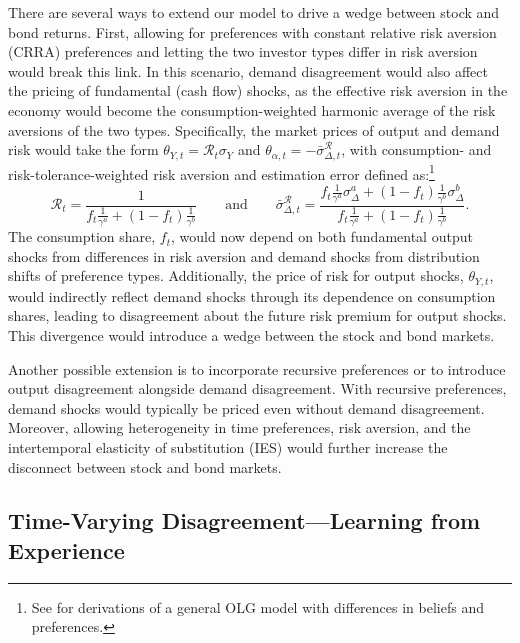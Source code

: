 \documentclass[preprint,11pt,authoryear]{elsarticle}
\theoremstyle{plain}
\begin{document}
There are several ways to extend our model to drive a wedge between stock and bond returns. First, allowing for preferences with constant relative risk aversion (CRRA) preferences and letting the two investor types differ in risk aversion would break this link. In this scenario, demand disagreement would also affect the pricing of fundamental (cash flow) shocks, as the effective risk aversion in the economy would become the consumption-weighted harmonic average of the risk aversions of the two types. Specifically, the market prices of output and demand risk would take the form \(\theta_{Y,t} = \mathcal{R}_t \sigma_Y\) and \(\theta_{\alpha,t} = -\bar{\sigma}^{\mathcal{R}}_{\Delta,t}\), with consumption- and risk-tolerance-weighted risk aversion and estimation error defined as:\footnote{See \cite{HeyerdahlLarsenIlledistch23} for derivations of a general OLG model with differences in beliefs and preferences.}
\begin{equation}
\mathcal{R}_t = \frac{1}{f_t \frac{1}{\gamma^a} + \left(1 - f_t\right) \frac{1}{\gamma^b}} \qquad \text{and} \qquad \bar{\sigma}^{\mathcal{R}}_{\Delta,t} = \frac{f_t \frac{1}{\gamma^a} \sigma_{\Delta}^a + \left(1 - f_t\right) \frac{1}{\gamma^b} \sigma_{\Delta}^b}{f_t \frac{1}{\gamma^a} + \left(1 - f_t\right) \frac{1}{\gamma^b}}.
\end{equation}
The consumption share, \(f_t\), would now depend on both fundamental output shocks from differences in risk aversion and demand shocks from distribution shifts of preference types. Additionally, the price of risk for output shocks, \(\theta_{Y,t}\), would indirectly reflect demand shocks through its dependence on consumption shares, leading to disagreement about the future risk premium for output shocks. This divergence would introduce a wedge between the stock and bond markets.

Another possible extension is to incorporate recursive preferences or to introduce output disagreement alongside demand disagreement. With recursive preferences, demand shocks would typically be priced even without demand disagreement. Moreover, allowing heterogeneity in time preferences, risk aversion, and the intertemporal elasticity of substitution (IES) would further increase the disconnect between stock and bond markets.



\subsection{Time-Varying Disagreement---Learning from Experience}\label{sec:TimeVaryingBeliefs}
\end{document}
